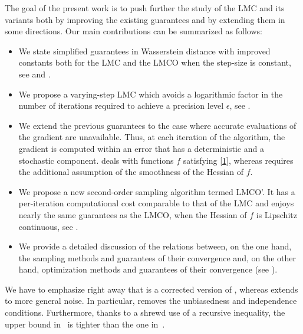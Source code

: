 \documentclass[aoap,preprint,reqno,a4paper]{imsart} %
\newcommand{\eps}{\epsilon}
\begin{document}
The goal of the present work is to push further the study of the LMC and its variants both by
improving the existing guarantees and by extending them in some directions. Our main contributions
can be summarized as follows:
\begin{itemize}

\item We state simplified guarantees in Wasserstein distance with improved constants
both for the LMC and the LMCO when the step-size is constant, see  and
.

\item We propose a varying-step LMC which avoids a logarithmic factor in the number
of iterations required to achieve a precision level $\eps$, see .

\item We extend the previous guarantees to the case where accurate evaluations of the gradient are
unavailable. Thus, at each iteration of the algorithm, the gradient is computed within an error that
has a deterministic and a stochastic component.  deals with functions $f$ satisfying \eqref{1},
whereas  requires the additional assumption of the smoothness of the Hessian of $f$.

\item We propose a new second-order sampling algorithm termed LMCO'. It has a per-iteration computational
cost comparable to that of the LMC and enjoys nearly the same guarantees as the LMCO, when the Hessian
of $f$ is Lipschitz continuous, see .

\item We provide a detailed discussion of the relations between, on the one hand, the sampling methods
and guarantees of their convergence and, on the other hand, optimization methods and guarantees of their
convergence (see ).
\end{itemize}
We have to emphasize right away that  is a corrected version of
\citep[Theorem 1]{DalalyanColt}, whereas  extends \citep[Theorem 3]{DalalyanColt}
to more general noise. In particular,  removes the unbiasedness and independence
conditions.  Furthermore, thanks to a shrewd use of a recursive inequality, the upper bound
in~ is tighter than the one in~\citep[Theorem 3]{DalalyanColt}.
\end{document}

